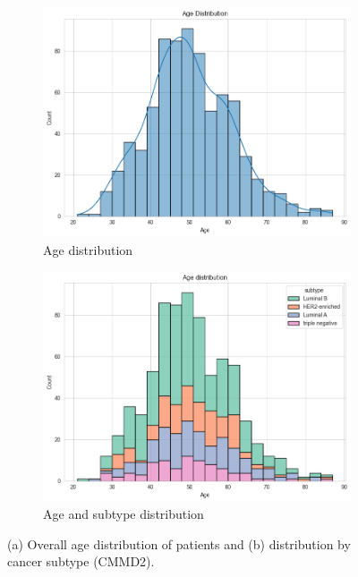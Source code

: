 \documentclass[a4paper,10pt]{book}
\begin{document}
\begin{figure}[h!]
	\centering
	\begin{subfigure}[c]{0.49\textwidth}
		\centering
		\includegraphics[width=\textwidth]{reports//assets/age.png}
		\caption{Age distribution}
		\label{fig:age_dist}
	\end{subfigure}
	\begin{subfigure}[c]{0.49\textwidth}
		\centering
		\includegraphics[width=\textwidth]{reports/assets/age_subtype.png}
		\caption{Age and subtype distribution}
		\label{fig:age_subtype}
	\end{subfigure}
	\caption{(a) Overall age distribution of patients and (b) distribution by cancer subtype (CMMD2).}
	\label{fig:age_dist_all}
\end{figure}
\end{document}
